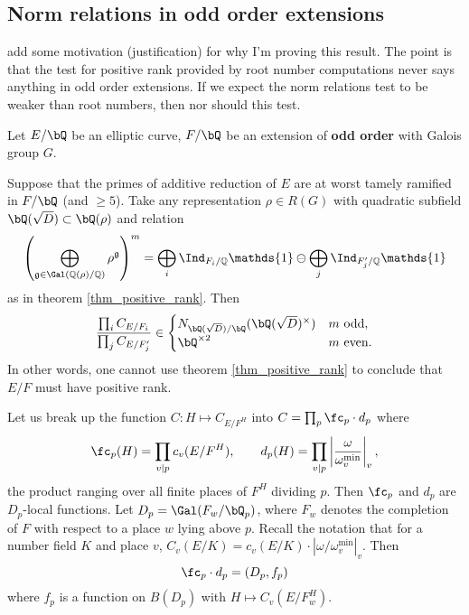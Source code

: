 \subsection{Norm relations in odd order extensions}

{\color{red} add some motivation (justification) for why I'm proving this result. The point is that the test for positive rank provided by root number computations never says anything in odd order extensions. If we expect the norm relations test to be weaker than root numbers, then nor should this test.}

\begin{thm}\label{odd-exts}
 Let $E / \bQ$ be an elliptic curve, $F / \bQ$ be an extension of \textbf{odd order} with Galois group $G$. 
 
Suppose that the primes of additive reduction of $E$ are at worst tamely ramified in $F / \bQ$ (and $\geq 5$). 
Take any representation $\rho \in R(G)$ with quadratic subfield $\bQ(\sqrt{D}) \subset \bQ(\rho)$ and relation
\begin{equation*}\label{odd-exp}
 \left(\bigoplus_{\mathfrak{g}\in\Gal(\QQ(\rho)/\QQ)}\rho^{\mathfrak{g}}\right)^m=\bigoplus_i\Ind_{F_i/\QQ}\mathds{1}\ominus\bigoplus_j\Ind_{F'_j/\QQ}\mathds{1}
\end{equation*}
 as in theorem \ref{thm_positive_rank}. Then
 \[ \frac{\prod_i C_{E/F_i}}{\prod_j C_{E/F_j'}}  \in 
    \begin{cases}
        N_{\bQ(\sqrt{D}) / \bQ}(\bQ(\sqrt{D})^{\times}) & m \ \text{odd}, \\
        \bQ^{\times 2} & m \ \text{even}.
    \end{cases} \] 
    In other words, one cannot use theorem \ref{thm_positive_rank} to conclude that $E / F$ must have positive rank. 
\end{thm}
Let us break up the function $C \colon H \mapsto C_{E / F^H}$ into $C = \prod_p  \fc_p \cdot d_p$ where
\begin{equation}\label{c-and-d}
         \fc_p(H) = \prod_{v | p}  c_v(E / F^H) , \qquad d_p(H) = \prod_{v | p} \left|\frac{\omega}{\omega_{v}^{\min}}\right|_v, 
\end{equation}
the product ranging over all finite places of $F^H$ dividing $p$.
Then $\fc_p$ and $d_p$ are $D_p$-local functions. Let $D_p = \Gal(F_w / \bQ_p)$, where $F_w$ denotes the completion of $F$ with respect to a place $w$ lying above $p$. Recall the notation that for a number field $K$ and place $v$, $C_v(E / K) = c_v(E / K) \cdot \left| \omega / \omega_v^{\min} \right|_v.$ 
Then
\begin{equation}\label{Dp-loc}
\fc_p \cdot d_p = (D_p, f_p)
\end{equation}
where $f_p$ is a function on $B(D_p)$ with $H \mapsto C_v(E / F_w^H)$.


